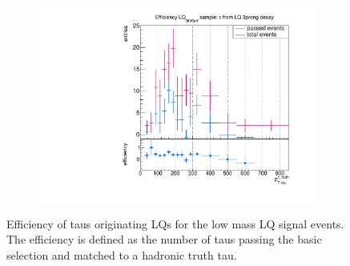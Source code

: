 \begin{figure}
\begin{subfigure}[t]{0.49\textwidth}
                \label{DividedfromLQ:signal:1prongLQ75}
                \end{subfigure}
                \begin{subfigure}[t]{0.49\textwidth}
                \includegraphics[width=\textwidth]{figures/plots/LQ75/Divided_fromLQ3prong.pdf}
                \label{DividedfromLQ:signal:3prong}
                \end{subfigure}
\caption[Efficiency of taus originating LQs for the low mass LQ signal events.]{Efficiency of taus originating LQs for the low mass LQ signal events. The efficiency is defined as the number of taus passing the basic selection and matched to a hadronic truth tau.}
\label{DividedFromLQ:signal:LQ75}
\end{figure}
%
%
